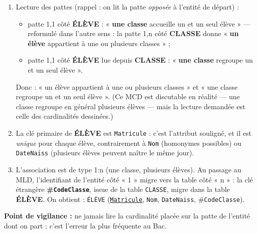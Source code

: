 \documentclass[11pt]{article}
\begin{document}
\begin{corrige}
\begin{enumerate}
  \item Lecture des pattes (rappel : on lit la patte \emph{opposée} à l'entité de départ) :
  \begin{itemize}
    \item patte 1,1 côté \textbf{ÉLÈVE} : « \textbf{une classe} accueille un et un seul élève » — reformulé dans l'autre sens : la patte 1,n côté \textbf{CLASSE} donne « \textbf{un élève} appartient à une ou plusieurs classes » ;
    \item patte 1,1 côté \textbf{ÉLÈVE} lue depuis \textbf{CLASSE} : « \textbf{une classe} regroupe un et un seul élève ».
  \end{itemize}
  Donc : « un élève appartient à une ou plusieurs classes » et « une classe regroupe un et un seul élève ». (Ce MCD est discutable en réalité — une classe regroupe en général plusieurs élèves — mais la lecture demandée est celle des cardinalités dessinées.)
  \item La clé primaire de \textbf{ÉLÈVE} est \texttt{Matricule} : c'est l'attribut souligné, et il est \emph{unique} pour chaque élève, contrairement à \texttt{Nom} (homonymes possibles) ou \texttt{DateNaiss} (plusieurs élèves peuvent naître le même jour).
  \item L'association est de type 1:n (une classe, plusieurs élèves). Au passage au MLD, l'identifiant de l'entité côté « 1 » migre vers la table côté « n » : la clé étrangère \textbf{\#\texttt{CodeClasse}}, issue de la table \texttt{CLASSE}, migre dans la table \textbf{ÉLÈVE}. On obtient : \texttt{ÉLÈVE} (\underline{\texttt{Matricule}}, \texttt{Nom}, \texttt{DateNaiss}, \#\texttt{CodeClasse}).
\end{enumerate}
\textbf{Point de vigilance :} ne jamais lire la cardinalité placée sur la patte de l'entité dont on part ; c'est l'erreur la plus fréquente au Bac.
\end{corrige}
\end{document}
